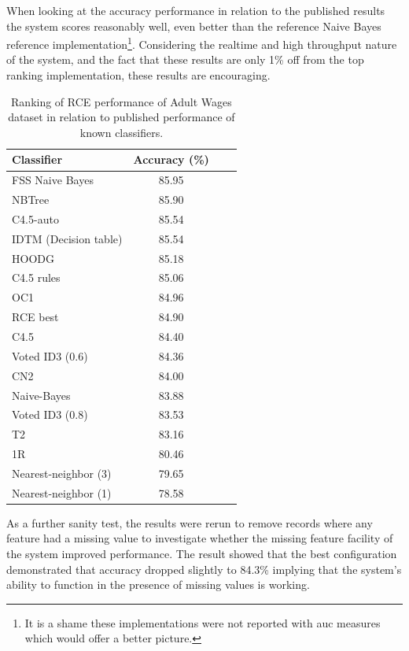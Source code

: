 \documentclass[a4paper,11pt]{scrreprt}
\begin{document}
When looking at the accuracy performance in relation to the published results the system scores reasonably well, even better than the reference Naive Bayes reference implementation\footnote{It is a shame these implementations were not reported with \acrshort{auc} measures which would offer a better picture.}. Considering the realtime and high throughput nature of the system, and the fact that these results are only 1\% off from the top ranking implementation, these results are encouraging.

\begin{table}[h!]
\begin{tabular}{l*{2}{c}r}
Classifier & Accuracy (\%)\\
\hline

FSS Naive Bayes & 85.95 \\
NBTree & 85.90 \\
C4.5-auto & 85.54 \\
IDTM (Decision table) & 85.54 \\
HOODG & 85.18 \\
C4.5 rules & 85.06 \\
OC1 & 84.96 \\
\rowcolor{red!25} RCE best & 84.90 \\
C4.5 & 84.40 \\
Voted ID3 (0.6) & 84.36 \\
CN2 & 84.00 \\
Naive-Bayes & 83.88 \\
Voted ID3 (0.8) & 83.53 \\
T2 & 83.16 \\
1R & 80.46 \\
Nearest-neighbor (3) & 79.65 \\
Nearest-neighbor (1) & 78.58

\end{tabular}
\caption{Ranking of RCE performance of Adult Wages dataset in relation to published performance of known classifiers.}
\label{tab:classiferrank}
\end{table}
As a further sanity test, the results were rerun to remove records where any feature had a missing value to investigate whether the missing feature facility of the system improved performance. The result showed that the best configuration demonstrated that accuracy dropped slightly to 84.3\% implying that the system's ability to function in the presence of missing values is working.
\clearpage
\end{document}
